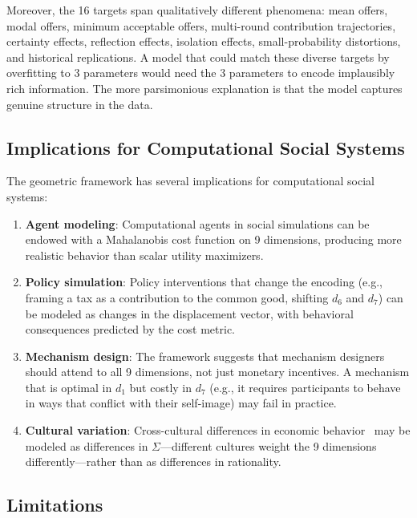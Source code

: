 \documentclass[journal]{IEEEtran}
\begin{document}
Moreover, the 16 targets span qualitatively different phenomena: mean offers, modal offers, minimum acceptable offers, multi-round contribution trajectories, certainty effects, reflection effects, isolation effects, small-probability distortions, and historical replications.
A model that could match these diverse targets by overfitting to 3 parameters would need the 3 parameters to encode implausibly rich information.
The more parsimonious explanation is that the model captures genuine structure in the data.

\subsection{Implications for Computational Social Systems}

The geometric framework has several implications for computational social systems:
\begin{enumerate}
    \item \textbf{Agent modeling}: Computational agents in social simulations can be endowed with a Mahalanobis cost function on 9 dimensions, producing more realistic behavior than scalar utility maximizers.
    \item \textbf{Policy simulation}: Policy interventions that change the encoding (e.g., framing a tax as a contribution to the common good, shifting $d_6$ and $d_7$) can be modeled as changes in the displacement vector, with behavioral consequences predicted by the cost metric.
    \item \textbf{Mechanism design}: The framework suggests that mechanism designers should attend to all 9 dimensions, not just monetary incentives. A mechanism that is optimal in $d_1$ but costly in $d_7$ (e.g., it requires participants to behave in ways that conflict with their self-image) may fail in practice.
    \item \textbf{Cultural variation}: Cross-cultural differences in economic behavior~\cite{henrich2010} may be modeled as differences in $\Sigma$---different cultures weight the 9 dimensions differently---rather than as differences in rationality.
\end{enumerate}

\subsection{Limitations}
\end{document}
